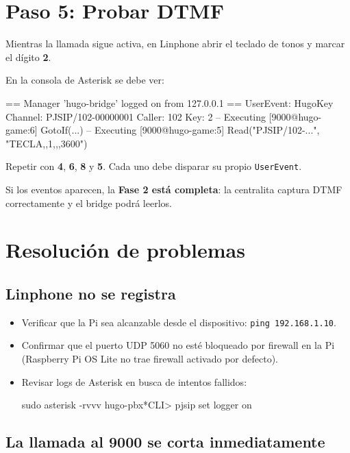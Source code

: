 \section{Paso 5: Probar DTMF}

Mientras la llamada sigue activa, en Linphone abrir el teclado de tonos y marcar el dígito \textbf{2}.

En la consola de Asterisk se debe ver:

\begin{plaincode}
== Manager 'hugo-bridge' logged on from 127.0.0.1
== UserEvent: HugoKey
   Channel: PJSIP/102-00000001
   Caller: 102
   Key: 2
-- Executing [9000@hugo-game:6] GotoIf(...)
-- Executing [9000@hugo-game:5] Read("PJSIP/102-...", "TECLA,,1,,,3600")
\end{plaincode}

Repetir con \textbf{4}, \textbf{6}, \textbf{8} y \textbf{5}. Cada uno debe disparar su propio \texttt{UserEvent}.

Si los eventos aparecen, la \textbf{Fase 2 está completa}: la centralita captura DTMF correctamente y el bridge podrá leerlos.

\section{Resolución de problemas}

\subsection{Linphone no se registra}

\begin{itemize}
  \item Verificar que la Pi sea alcanzable desde el dispositivo: \texttt{ping 192.168.1.10}.
  \item Confirmar que el puerto UDP 5060 no esté bloqueado por firewall en la Pi (Raspberry Pi OS Lite no trae firewall activado por defecto).
  \item Revisar logs de Asterisk en busca de intentos fallidos:
  \begin{shellcode}
sudo asterisk -rvvv
hugo-pbx*CLI> pjsip set logger on
  \end{shellcode}
\end{itemize}

\subsection{La llamada al 9000 se corta inmediatamente}

